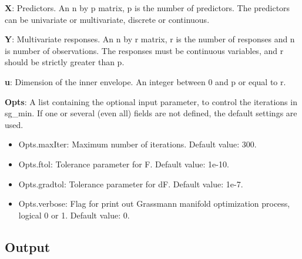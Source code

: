 \documentclass[a4paper,11pt,openany]{memoir}
\begin{document}
\begin{par}
\textbf{X}: Predictors. An n by p matrix, p is the number of predictors. The predictors can be univariate or multivariate, discrete or continuous.
\end{par} \vspace{1em}
\begin{par}
\textbf{Y}: Multivariate responses. An n by r matrix, r is the number of responses and n is number of observations. The responses must be continuous variables, and r should be strictly greater than p.
\end{par} \vspace{1em}
\begin{par}
\textbf{u}: Dimension of the inner envelope. An integer between 0 and p or equal to r.
\end{par} \vspace{1em}
\begin{par}
\textbf{Opts}: A list containing the optional input parameter, to control the iterations in sg\_min. If one or several (even all) fields are not defined, the default settings are used.
\end{par} \vspace{1em}
\begin{itemize}
\setlength{\itemsep}{-1ex}
   \item Opts.maxIter: Maximum number of iterations.  Default value: 300.
   \item Opts.ftol: Tolerance parameter for F.  Default value: 1e-10.
   \item Opts.gradtol: Tolerance parameter for dF.  Default value: 1e-7.
   \item Opts.verbose: Flag for print out Grassmann manifold optimization process, logical 0 or 1. Default value: 0.
\end{itemize}


\subsection*{Output}
\end{document}
